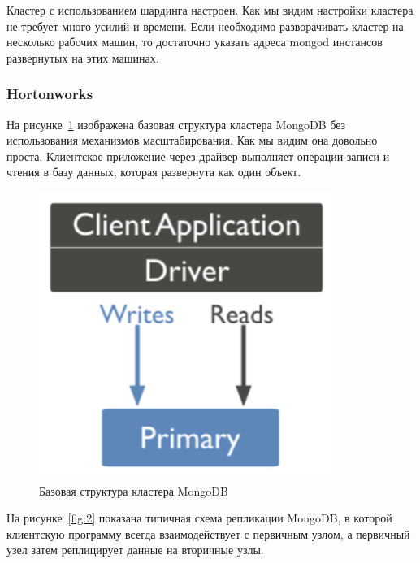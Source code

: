Кластер с использованием шардинга настроен.
Как мы видим настройки кластера не требует много усилий и времени. Если необходимо разворачивать кластер на несколько рабочих машин, то достаточно указать адреса mongod инстансов развернутых на этих машинах.

\subsubsection{Hortonworks}
На рисунке~\ref{fig:1} изображена базовая структура кластера MongoDB без использования механизмов масштабирования. Как мы видим она довольно проста. Клиентское приложение через драйвер выполняет операции записи и чтения в базу данных, которая развернута как один объект.

\begin{figure}[H]
    \centering
    \includegraphics{1}
    \caption{Базовая структура кластера MongoDB}
    \label{fig:1}
\end{figure}

На рисунке~\ref{fig:2} показана типичная схема репликации MongoDB, в которой клиентскую программу всегда взаимодействует с первичным узлом, а первичный узел затем реплицирует данные на вторичные узлы.

